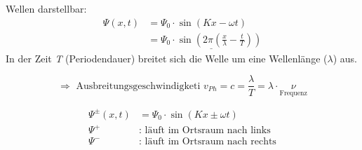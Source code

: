 Wellen darstellbar:
\begin{align*}
\Psi(x,t) &= \Psi_0 \cdot \sin(Kx-\omega t)\\
&= \underline{\Psi_0 \cdot \sin (2\pi(\frac{x}{\lambda} - \frac{t}{T}))}
\end{align*}
In der Zeit \emph{T} (Periodendauer) breitet sich die Welle um eine Wellenlänge ($ \lambda $) aus.

$$ \Rightarrow \text{ Ausbreitungsgeschwindigketi } \boxed{ v_{Ph} = c = \frac{\lambda}{T} = \lambda \cdot \underset{\text{Frequenz}}{\nu} } $$

\begin{align*}
\Psi^{\pm}(x,t)&=\Psi_0 \cdot \sin(Kx\pm\omega t)\\
\Psi^{+} &\text{: läuft im Ortsraum nach links}\\
\Psi^{-} &\text{: läuft im Ortsraum nach rechts}
\end{align*}